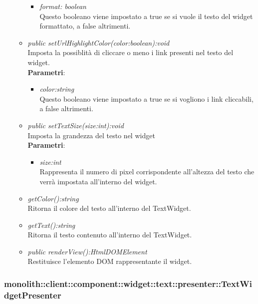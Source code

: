 \begin{itemize}
\begin{itemize}
\begin{itemize}
		\item \textit{format: boolean}\\
		Questo booleano viene impostato a true se si vuole il testo del widget formattato, a false altrimenti.
		\end{itemize} 
	\item \textit{public setUrlHighlightColor(color:boolean):void}\\
	Imposta la possiblità di cliccare o meno i link presenti nel testo del widget.
		\\ \textbf{Parametri}: \begin{itemize}
		\item \textit{color:string}\\
		Questo booleano viene impostato a true se si vogliono i link cliccabili, a false altrimenti.
		\end{itemize} 
	\item \textit{public setTextSize(size:int):void}\\
	Imposta la grandezza del testo nel widget
		\\ \textbf{Parametri}: \begin{itemize}
		\item \textit{size:int}\\
		Rappresenta il numero di pixel corrispondente all'altezza del testo che verrà impostata all'interno del widget.
		\end{itemize} 
	\item \textit{getColor():string}\\
	Ritorna il colore del testo all'interno del TextWidget.
	\item \textit{getText():string}\\
	Ritorna il testo contenuto all'interno del TextWidget.
	\item \textit{public renderView():HtmlDOMElement}\\
	Restituisce l'elemento DOM rappresentante il widget.
	\end{itemize}
\end{itemize}

\subsubsection{monolith::client::component::widget::text::presenter::TextWidgetPresenter}

